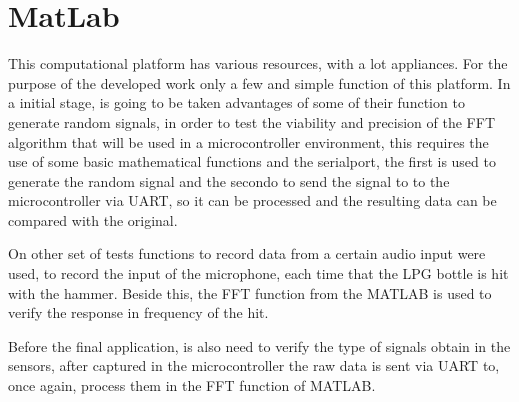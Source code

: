 \section{MatLab}
This computational platform has various resources, with a lot appliances. For the purpose of the developed work only a few and simple function of this platform. In a initial stage, is going to be taken advantages of some of their function to generate random signals, in order to test the viability and precision of the FFT algorithm that will be used in a microcontroller environment, this requires the use of some basic mathematical functions and the serialport, the first is used to generate the random signal and the secondo to send the signal to to the microcontroller via UART, so it can be processed and the resulting data can be compared with the original. 

On other set of tests functions to record data from a certain audio input were used, to record the input of the microphone, each time that the LPG bottle is hit with the hammer. Beside this, the FFT function from the MATLAB is used to verify the response in frequency of the hit. 

Before the final application, is also need to verify the type of signals obtain in the sensors, after captured in the microcontroller the raw data is sent via UART to, once again, process them in the FFT function of MATLAB. 

